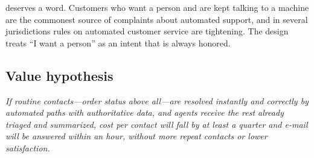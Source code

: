  deserves a word. Customers who want a person and are kept talking to a machine are the commonest source of complaints about automated support, and in several jurisdictions rules on automated customer service are tightening. The design treats ``I want a person'' as an intent that is always honored.

\subsection{Value hypothesis}

\begin{keyidea}
\emph{If routine contacts---order status above all---are resolved instantly and correctly by automated paths with authoritative data, and agents receive the rest already triaged and summarized, cost per contact will fall by at least a quarter and e-mail will be answered within an hour, without more repeat contacts or lower satisfaction.}
\end{keyidea}
